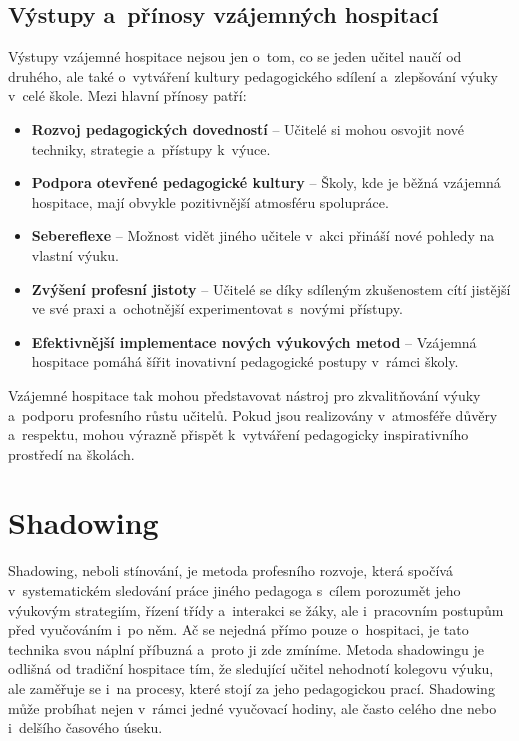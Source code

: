 \subsection{Výstupy a~přínosy vzájemných hospitací}
Výstupy vzájemné hospitace nejsou jen o~tom, co se jeden učitel naučí od druhého, ale také o~vytváření kultury pedagogického sdílení a~zlepšování výuky v~celé škole. Mezi hlavní přínosy patří:

\begin{itemize}
    \item \textbf{Rozvoj pedagogických dovedností} – Učitelé si mohou osvojit nové techniky, strategie a~přístupy k~výuce.
    \item \textbf{Podpora otevřené pedagogické kultury} – Školy, kde je běžná vzájemná hospitace, mají obvykle pozitivnější atmosféru spolupráce.
    \item \textbf{Sebereflexe} – Možnost vidět jiného učitele v~akci přináší nové pohledy na vlastní výuku.
    \item \textbf{Zvýšení profesní jistoty} – Učitelé se díky sdíleným zkušenostem cítí jistější ve své praxi a~ochotnější experimentovat s~novými přístupy.
    \item \textbf{Efektivnější implementace nových výukových metod} – Vzájemná hospitace pomáhá šířit inovativní pedagogické postupy v~rámci školy.
\end{itemize}

Vzájemné hospitace tak mohou představovat nástroj pro zkvalitňování výuky a~podporu profesního růstu učitelů. Pokud jsou realizovány v~atmosféře důvěry a~respektu, mohou výrazně přispět k~vytváření pedagogicky inspirativního prostředí na školách.

\section{Shadowing}
Shadowing, neboli stínování, je metoda profesního rozvoje, která spočívá v~systematickém sledování práce jiného pedagoga s~cílem porozumět jeho výukovým strategiím, řízení třídy a~interakci se žáky, ale i~pracovním postupům před vyučováním i~po něm. Ač se nejedná přímo pouze o~hospitaci, je tato technika svou náplní příbuzná a~proto ji zde zmíníme. Metoda shadowingu je odlišná od tradiční hospitace tím, že sledující učitel nehodnotí kolegovu výuku, ale zaměřuje se i~na procesy, které stojí za jeho pedagogickou prací. Shadowing může probíhat nejen v~rámci jedné vyučovací hodiny, ale často celého dne nebo i~delšího časového úseku.

